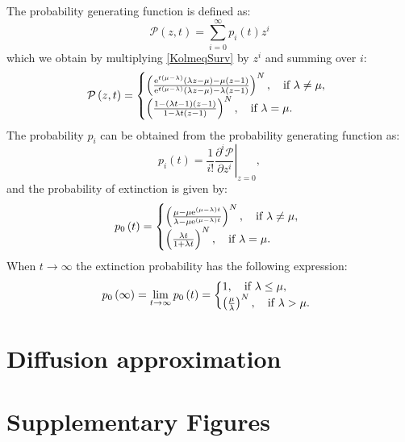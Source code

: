 \documentclass[12pt]{extarticle}
\newcommand{\e}{{\rm e}}
\newcommand{\beginsupplement}{%
      	\setcounter{table}{0}
        \renewcommand{\thetable}{S\arabic{table}}%
        \setcounter{figure}{0}
        \renewcommand{\thefigure}{S\arabic{figure}}%
		\setcounter{equation}{0}
        \renewcommand{\theequation}{A\arabic{equation}}%
}
\begin{document}
\begin{appendices}
The probability generating function is defined as:
\begin{equation*}
\mathcal{P}\left(z,t\right)=\sum_{i=0}^\infty p_i\left(t\right)z^i
\end{equation*}
which we obtain by multiplying \eqref{KolmeqSurv} by $z^i$ and summing over $i$:
\begin{align*}
\mathcal{P}\left(z,t\right)=\left\{
  \begin{array}{@{}ll@{}}
  \left(\frac{\e^{t\left(\mu-\lambda\right)}\left(\lambda z-\mu\right)-\mu\left(z-1\right)}{\e^{t\left(\mu-\lambda\right)}\left(\lambda z-\mu\right)-\lambda\left(z-1\right)}\right)^N,\quad \text{if }\lambda\neq\mu, \\
  \left(\frac{1-\left(\lambda t-1\right)\left(z-1\right)}{1-\lambda t\left(z-1\right)}\right)^N,\quad \text{if }\lambda=\mu.
  \end{array}\right.
\end{align*}
The probability $p_i$ can be obtained from the probability generating function as:
\begin{equation*}
p_i\left(t\right)=\left.\frac{1}{i!}\frac{\partial^i\mathcal{P}}{\partial z^i}\right|_{z=0},
\end{equation*}
and the probability of extinction is given by:
\begin{align*}
p_0\left(t\right)=\left\{
  \begin{array}{@{}ll@{}}
  \left(\frac{\mu-\mu\e^{\left(\mu-\lambda\right)t}}{\lambda-\mu\e^{\left(\mu-\lambda\right)t}}\right)^N,\quad \text{if }\lambda\neq\mu, \\
  \left(\frac{\lambda t}{1+\lambda t}\right)^N,\quad \text{if }\lambda=\mu.
  \end{array}\right.
\end{align*}
When $t\rightarrow\infty$ the extinction probability has the following expression:
\begin{align*}
p_0\left(\infty\right)=\lim_{t\rightarrow\infty}p_0\left(t\right)=\left\{
  \begin{array}{@{}ll@{}}
  1,\quad \text{if }\lambda\leq\mu, \\
  \left(\frac{\mu}{\lambda}\right)^N,\quad \text{if }\lambda>\mu.
  \end{array}\right.
\end{align*}
\section*{Diffusion approximation}\label{AppendixDiffApprox}
\end{appendices}

\newpage
\section*{Supplementary Figures}
\beginsupplement %

\end{document}
